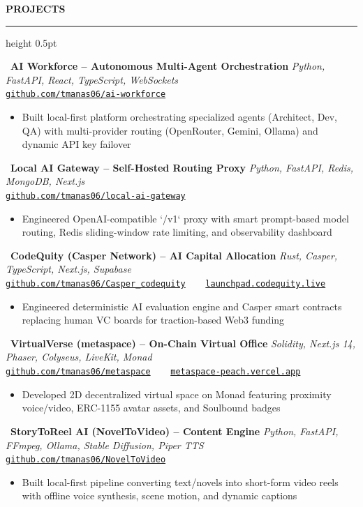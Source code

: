 \documentclass[11pt,a4paper]{article}
\newcommand{\cvsection}[1]{%
  \vspace{7pt}%
  {\large\textbf{\MakeUppercase{#1}}}%
  \vspace{2pt}%
  \hrule height 0.5pt%
  \vspace{4pt}%
}
\newcommand{\projectentry}[4]{%
  \noindent
  \faGithub\ \textbf{#1} \hfill \textit{#2} \\
  {\small\texttt{#3}}
  \begin{itemize}[leftmargin=1.5em, itemsep=0.5pt, parsep=0pt, topsep=1pt]
    #4
  \end{itemize}
  \vspace{1.5pt}
}
\begin{document}
\newpage
\cvsection{Projects}

\projectentry{AI Workforce -- Autonomous Multi-Agent Orchestration}%
  {Python, FastAPI, React, TypeScript, WebSockets}%
  {\href{https://github.com/tmanas06/ai-workforce}{github.com/tmanas06/ai-workforce}}%
  {\item Built local-first platform orchestrating specialized agents (Architect, Dev, QA) with multi-provider routing (OpenRouter, Gemini, Ollama) and dynamic API key failover}

\projectentry{Local AI Gateway -- Self-Hosted Routing Proxy}%
  {Python, FastAPI, Redis, MongoDB, Next.js}%
  {\href{https://github.com/tmanas06/local-ai-gateway}{github.com/tmanas06/local-ai-gateway}}%
  {\item Engineered OpenAI-compatible `/v1` proxy with smart prompt-based model routing, Redis sliding-window rate limiting, and observability dashboard}

\projectentry{CodeQuity (Casper Network) -- AI Capital Allocation}%
  {Rust, Casper, TypeScript, Next.js, Supabase}%
  {\href{https://github.com/tmanas06/Casper_codequity}{github.com/tmanas06/Casper\_codequity} \ \textbar\ \ \href{https://launchpad.codequity.live/}{launchpad.codequity.live}}%
  {\item Engineered deterministic AI evaluation engine and Casper smart contracts replacing human VC boards for traction-based Web3 funding}

\projectentry{VirtualVerse (metaspace) -- On-Chain Virtual Office}%
  {Solidity, Next.js 14, Phaser, Colyseus, LiveKit, Monad}%
  {\href{https://github.com/tmanas06/metaspace}{github.com/tmanas06/metaspace} \ \textbar\ \ \href{https://metaspace-peach.vercel.app}{metaspace-peach.vercel.app}}%
  {\item Developed 2D decentralized virtual space on Monad featuring proximity voice/video, ERC-1155 avatar assets, and Soulbound badges}

\projectentry{StoryToReel AI (NovelToVideo) -- Content Engine}%
  {Python, FastAPI, FFmpeg, Ollama, Stable Diffusion, Piper TTS}%
  {\href{https://github.com/tmanas06/NovelToVideo}{github.com/tmanas06/NovelToVideo}}%
  {\item Built local-first pipeline converting text/novels into short-form video reels with offline voice synthesis, scene motion, and dynamic captions}
\end{document}
